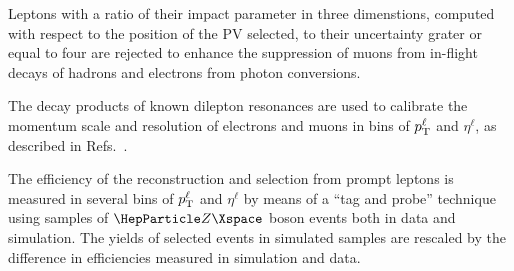 Leptons with a ratio of their impact parameter in three dimenstions, computed with respect to the position of the PV selected, to their uncertainty grater or equal to four are rejected to enhance the suppression of muons from in-flight decays of hadrons and electrons from photon conversions.

The decay products of known dilepton resonances are used to calibrate the momentum scale and resolution of electrons and muons in bins of $p_{\mathrm{T}}^{\ell}$ and $\eta^{\ell}$, as described in Refs.~\cite{EGM-17-001,Sirunyan:2018}.

The efficiency of the reconstruction and selection from prompt leptons is measured in several bins of $p_{\mathrm{T}}^{\ell}$ and $\eta^{\ell}$ by means of a ``tag and probe'' technique~\cite{CMS:2011aa} using samples of $\PZ$ boson events both in data and simulation. The yields of selected events in simulated samples are rescaled by the difference in efficiencies measured in simulation and data.


